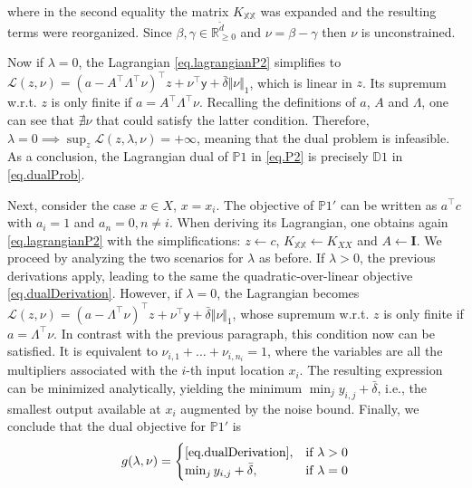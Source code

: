 \begin{my_proof}
	where in the second equality the matrix $K_{\mathds{X}\mathds{X}}$ was expanded and the resulting terms were reorganized. Since $\beta,\gamma \in \mathbb{R}^{\tilde d}_{\geq 0}$ and $\nu = \beta - \gamma$ then $\nu$ is unconstrained.
	
	Now if $\lambda = 0$, the Lagrangian \eqref{eq.lagrangianP2} simplifies to
	$\mathcal{L}(z,\nu) = (a - A^\top \Lambda^\top \nu)^\top z + \nu^\top \mathsf{y} + \bar\delta \Vert \nu \Vert_1 \label{eq.lamZero}$, which is linear in $z$. Its supremum w.r.t. $z$ is only finite if $a = A^\top\Lambda^\top\nu$. Recalling the definitions of $a$, $A$ and $\Lambda$, one can see that $\nexists \nu$ that could satisfy the latter condition. Therefore, $\lambda = 0 \implies \sup_z \mathcal{L}(z,\lambda,\nu) = +\infty$, meaning that the dual problem is infeasible. As a conclusion, the Lagrangian dual of $\mathds{P}1$ in \eqref{eq.P2} is precisely $\mathds{D}1$ in \eqref{eq.dualProb}.
	
	Next, consider the case $x \in X$, $x = x_i$. The objective of $\mathds{P}1'$ can be written as $a^\top c$ with $a_i = 1$ and $a_n=0, n \neq i$. When deriving its Lagrangian, one obtains again \eqref{eq.lagrangianP2} with the simplifications: $z \leftarrow c$, $K_{\mathds{X}\mathds{X}} \leftarrow K_{XX}$ and $A \leftarrow \textbf{I}$. We proceed by analyzing the two scenarios for $\lambda$ as before. If $\lambda > 0$, the previous derivations apply, leading to the same the quadratic-over-linear objective \eqref{eq.dualDerivation}. However, if $\lambda = 0$, the Lagrangian becomes $\mathcal{L}(z,\nu) = (a -  \Lambda^\top \nu)^\top z + \nu^\top \mathsf{y} + \bar\delta \Vert \nu \Vert_1$, whose supremum w.r.t. $z$ is only finite if $a = \Lambda^\top \nu$. In contrast with the previous paragraph, this condition now can be satisfied. It is equivalent to $\nu_{i,1} + \dots + \nu_{i,n_i} = 1$, where the variables are all the multipliers associated with the $i$-th input location $x_i$. The resulting expression can be minimized analytically, yielding the minimum $\min_{j} y_{i,j} + \bar\delta$, i.e., the smallest output available at $x_i$ augmented by the noise bound. Finally, we conclude that the dual objective for $\mathds{P}1'$ is
	\begin{equation}
		g(\lambda,\nu) = 
		\begin{cases}
			\eqref{eq.dualDerivation}, & \text{if } \lambda > 0 \\
			\min_j y_{i,j} + \bar\delta, & \text{if } \lambda = 0
		\end{cases}
	\end{equation}
	

\end{my_proof}
